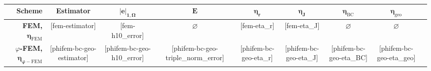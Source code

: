\begin{table}
\centering
\small
\begin{tabular}{r c c c c c c c c}
\toprule
\textbf{Scheme}                                              & \textbf{Estimator}         & $\bm{|e|_{1,\Omega}}$     & $\bm{E}$                          & $\bm{\eta_r}$         & $\bm{\eta_J}$         & $\bm{\eta_{\mathrm{BC}}}$ & $\bm{\eta_{\mathrm{geo}}}$ \\ \midrule
\textbf{FEM,} $\bm{\eta_{\mathrm{FEM}}}$                     & [fem-estimator]            & [fem-h10_error]           & $\varnothing$                     & [fem-eta_r]           & [fem-eta_J]           & $\varnothing$             & $\varnothing$              \\ \midrule
\textbf{$\varphi$-FEM,} $\bm{\eta_{\varphi-\mathrm{FEM}}}$   & [phifem-bc-geo-estimator]  & [phifem-bc-geo-h10_error] & [phifem-bc-geo-triple_norm_error] & [phifem-bc-geo-eta_r] & [phifem-bc-geo-eta_J] & [phifem-bc-geo-eta_BC]    & [phifem-bc-geo-eta_geo]    \\ \bottomrule
\end{tabular}
\caption{}
\label{tab:}
\end{table}
